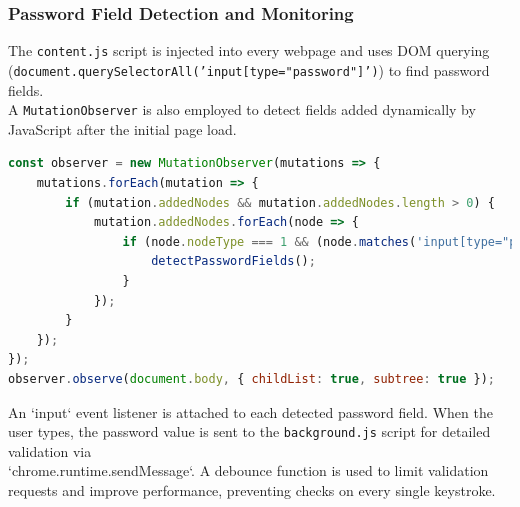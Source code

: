\documentclass[11pt,oneside,a4paper]{book}
\begin{document}
\subsubsection{Password Field Detection and Monitoring}
The \texttt{content.js} script is injected into every webpage and uses DOM querying\\
 (\texttt{document.querySelectorAll('input[type="password"]')}) to find password fields.\\ A \texttt{MutationObserver} is also employed to detect fields added dynamically by JavaScript after the initial page load.
\begin{lstlisting}[language=JavaScript, caption=Content Script MutationObserver for Dynamic Fields]
const observer = new MutationObserver(mutations => {
    mutations.forEach(mutation => {
        if (mutation.addedNodes && mutation.addedNodes.length > 0) {
            mutation.addedNodes.forEach(node => {
                if (node.nodeType === 1 && (node.matches('input[type="password"]') || node.querySelector('input[type="password"]'))) {
                    detectPasswordFields();
                }
            });
        }
    });
});
observer.observe(document.body, { childList: true, subtree: true });
\end{lstlisting}
An `input` event listener is attached to each detected password field. When the user types, the password value is sent to the \texttt{background.js} script for detailed validation via\\ `chrome.runtime.sendMessage`. A debounce function is used to limit validation requests and improve performance, preventing checks on every single keystroke.
\end{document}
